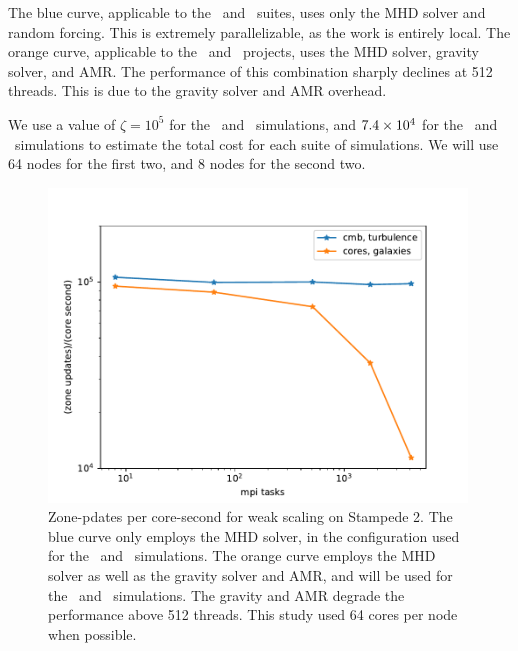 \documentclass[11pt]{NSF}  %
\begin{document}
The blue curve, applicable to the \nameCMB\ and \nameTurbulence\ suites, uses only the MHD
solver and random forcing.  This is extremely parallelizable, as the work is
entirely local.  The orange curve, applicable to the \nameCores\ and
\nameGalaxies\ projects,
uses the MHD solver, gravity solver, and AMR.  
The performance of this combination sharply declines at 512 threads.  
This is due to the gravity solver and AMR overhead.  

We use a value of $\zeta=10^5$ for the \nameCMB\ and \nameTurbulence\
simulations, and $7.4\times {10^{4}}$ for the \nameCores\ and \nameGalaxies\
simulations to estimate the total cost for each suite of simulations.  We will
use 64 nodes for the first two, and 8 nodes for the second two.


\begin{figure} \begin{center}
    \includegraphics[width=0.99\textwidth]{figs/g49_zoneup.pdf}
\caption[ ]{Zone-pdates per core-second for weak scaling on
    Stampede 2.    
The blue curve only employs
    the MHD solver, in the configuration used for the \nameCMB\ and \nameTurbulence\
    simulations.  The orange curve employs the MHD solver as well as the gravity
    solver and AMR,
 and will be used for the \nameCores\ and \nameGalaxies\ simulations.  The
 gravity and AMR degrade the performance above 512 threads.  This study used 64
 cores per node when possible.}
\label{fig.scaling} \end{center} \end{figure}




\end{document}
